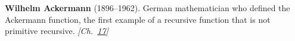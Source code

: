 \textbf{Wilhelm Ackermann} (1896–1962). German mathematician who defined the Ackermann function, the first example of a recursive function that is not primitive recursive. \emph{[Ch.~\hyperref[ch:bignumbers]{17}]}

